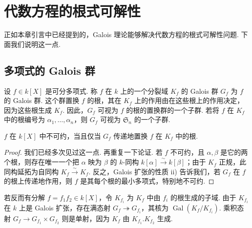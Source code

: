 \section{代数方程的根式可解性}\label{sec:galois-2-8}
正如本章引言中已经提到的，Galois 理论能够解决代数方程的根式可解性问题. 下面我们说明这一点.
\subsection{多项式的 Galois 群}\label{sec:galois-2-8-1}
设 $f\in k[X]$ 是可分多项式. 称 $f$ 在 $k$ 上的一个分裂域 $K_f$ 的 Galois 群 $G_f$ 为 $f$ 的 Galois 群. 这个群置换 $f$ 的根，其在 $K_f$ 上的作用由在这些根上的作用决定，因为这些根生成 $K_f$. 因此，$G_f$ 可视为 $f$ 的根的置换群的一个子群. 若将 $f$ 在 $K_f$ 中的根编号为 $\alpha_1,\ldots,\alpha_n$，则 $G_f$ 可视为 $\mathfrak S_n$ 的一个子群.
\begin{lemma*}
$f$ 在 $k[X]$ 中不可约，当且仅当 $G_f$ 传递地置换 $f$ 在 $K_f$ 中的根.
\end{lemma*}
\begin{proof}
我们已经多次见过这一点. 再重复一下论证. 若 $f$ 不可约，且 $\alpha,\beta$ 是它的两个根，则存在唯一一个把 $\alpha$ 映为 $\beta$ 的 $k$-同构 $k[\alpha]\xrightarrow\sim k[\beta]$；由于 $K_f$ 正规，此同构延拓为自同构 $K_f\xrightarrow\sim K_f$. 反之，Galois 扩张的性质 ii) 告诉我们，若 $G_f$ 在 $f$ 的根上传递地作用，则 $f$ 是其每个根的最小多项式，特别地不可约.
\end{proof}
若反而有分解 $f=f_1f_2\in k[X]$，令 $K_{f_i}$ 为 $K_f$ 中由 $f_i$ 的根生成的子域. 由于 $K_{f_i}$ 在 $k$ 上是 Galois 扩张，存在满态射 $G_f\twoheadrightarrow G_{f_i}$，其核为 $\operatorname{Gal}(K_f/K_{f_i})$. 乘积态射 $G_f\longrightarrow G_{f_1}\times G_{f_2}$ 则是单射，因为 $K_f$ 由 $K_{f_1}.K_{f_2}$ 生成.
